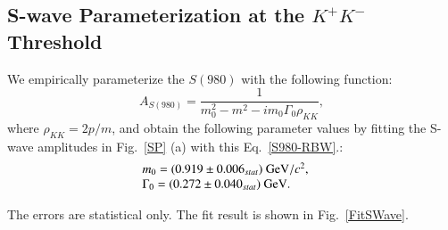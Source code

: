 \subsection{S-wave Parameterization at the $K^{+}K^{-}$ Threshold}
\label{MIPWA-RES}
\par{We empirically parameterize the $S(980)$ with the following function:
    \begin{equation}
        A_{S(980)} = \frac{1}{m_{0}^{2} - m^{2} -im_{0}\Gamma_{0}\rho_{KK}}, \label{S980-RBW}
    \end{equation}
    where $\rho_{KK} = 2p/m$, and obtain the following parameter values by fitting the S-wave amplitudes in Fig.~\ref{SP} (a) with this Eq.~\ref{S980-RBW}.:
    \begin{equation}
        \begin{array}{lr}
            m_{0} = (0.919 \pm 0.006_{stat}) \ {\rm GeV}/c^{2}, &\\
            \Gamma_{0} = (0.272 \pm 0.040_{stat}) \ {\rm GeV}. &
        \end{array}\label{S-wave parameters} 
    \end{equation}


    The errors are statistical only. The fit result is shown in Fig.~\ref{FitSWave}.
    
}
